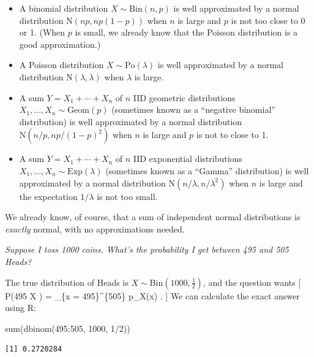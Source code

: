 \documentclass[
  letterpaper,
  DIV=11,
  numbers=noendperiod]{scrreprt}
\newenvironment{Shaded}{\begin{snugshade}}{\end{snugshade}}
\newcommand{\DecValTok}[1]{\textcolor[rgb]{0.68,0.00,0.00}{#1}}
\newcommand{\FunctionTok}[1]{\textcolor[rgb]{0.28,0.35,0.67}{#1}}
\newcommand{\NormalTok}[1]{\textcolor[rgb]{0.00,0.23,0.31}{#1}}
\newcommand{\SpecialCharTok}[1]{\textcolor[rgb]{0.37,0.37,0.37}{#1}}
\providecommand{\tightlist}{%
  \setlength{\itemsep}{0pt}\setlength{\parskip}{0pt}}\usepackage{longtable,booktabs,array}
\theoremstyle{remark}
\begin{document}
\begin{itemize}
\tightlist
\item
  A binomial distribution \(X \sim \mathrm{Bin}(n, p)\) is well
  approximated by a normal distribution \(\mathrm{N}(np, np(1-p))\) when
  \(n\) is large and \(p\) is not too close to 0 or 1. (When \(p\) is
  small, we already know that the Poisson distribution is a good
  approximation.)
\item
  A Poisson distribution \(X \sim \mathrm{Po}(\lambda)\) is well
  approximated by a normal distribution \(\mathrm{N}(\lambda, \lambda)\)
  when \(\lambda\) is large.
\item
  A sum \(Y = X_1 + \cdots + X_n\) of \(n\) IID geometric distributions
  \(X_1, \dots, X_n \sim \mathrm{Geom}(p)\) (sometimes known as a
  ``negative binomial'' distribution) is well approximated by a normal
  distribution \(\mathrm{N}(n/p, np/(1-p)^2)\) when \(n\) is large and
  \(p\) is not to close to 1.
\item
  A sum \(Y = X_1 + \cdots + X_n\) of \(n\) IID exponential
  distributions \(X_1, \dots, X_n \sim \mathrm{Exp}(\lambda)\)
  (sometimes known as a ``Gamma'' distribution) is well approximated by
  a normal distribution \(\mathrm{N}(n/\lambda, n/\lambda^2)\) when
  \(n\) is large and the expectation \(1/\lambda\) is not too small.
\end{itemize}

We already know, of course, that a sum of independent normal
distributions is \emph{exactly} normal, with no approximations needed.

\emph{Suppose I toss 1000 coins. What's the probability I get between
495 and 505 Heads?}

The true distribution of Heads is
\(X \sim \mathrm{Bin}(1000, \frac12)\), and the question wants {[}
\mathbb P(495 \leq X ) = \sum\_\{x = 495\}\^{}\{505\} p\_X(x) .
{]} We can calculate the exact answer using R:

\begin{Shaded}
\begin{Highlighting}[]
\FunctionTok{sum}\NormalTok{(}\FunctionTok{dbinom}\NormalTok{(}\DecValTok{495}\SpecialCharTok{:}\DecValTok{505}\NormalTok{, }\DecValTok{1000}\NormalTok{, }\DecValTok{1}\SpecialCharTok{/}\DecValTok{2}\NormalTok{))}
\end{Highlighting}
\end{Shaded}

\begin{verbatim}
[1] 0.2720284
\end{verbatim}
\end{document}
